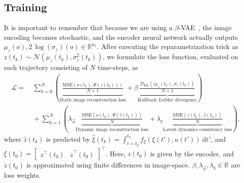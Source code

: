 \subsection{Training} 
It is important to remember that because we are using a $\beta$-\gls{VAE}~\citep{kingma2014auto, higgins2017beta}, the image encoding becomes stochastic, and the encoder neural network actually outputs $\mu_z(o), 2 \, \log(\sigma_z)(o) \in \mathbb{R}^{n_z}$. After executing the reparametrization trick as $z(t_k) \sim \mathcal{N}(\mu_z(t_k), \sigma_z^2(t_k))$, we formulate the loss function, evaluated on each trajectory consisting of $N$ time-steps, as
\begin{equation}\label{eq:training_loss}
\begin{split}
    \mathcal{L} =& \: \sum_{k=0}^{N} \left ( \underbrace{\frac{\mathrm{MSE}(o(t_k), \Psi(z(t_k)))}{N+1}}_{\text{Static image reconstruction loss}} + \beta \underbrace{\frac{\mathcal{D}_\mathrm{KL} \left ( (\mu_z(t_k), \sigma_z(t_k) \right )}{N+1}}_{\text{Kullback–Leibler divergence}} \right )\\
    &\: + \sum_{k=1}^{N} \left ( \lambda_{\vec{o}} \underbrace{ \frac{\mathrm{MSE}(o(t_k), \Psi(\hat{z}(t_k)))}{N}}_{\text{Dynamic image reconstruction loss}} + \lambda_{\mathrm{z}} \underbrace{\frac{\mathrm{MSE}(z(t_k), \hat{z}(t_k))}{N}}_{\text{Latent dynamics consistency loss}} \right ),
\end{split}
\end{equation}
where $\hat{z}(t_k)$ is predicted by $\hat{\xi}(t_k)  = \int_{t=t_0}^{t_k} f_\xi(\xi(t'), u(t')) \: \mathrm{d}t'$, and $\xi(t_0) = \begin{bmatrix}
    z^\top(t_0) & \dot{z}^\top(t_0)
\end{bmatrix}^\top$. Here, $z(t_0)$ is given by the encoder, and $\dot{z}(t_0)$ is approximated using finite differences in image-space. $\beta, \lambda_{\vec{o}}, \lambda_\mathrm{z} \in \mathbb{R}$ are loss weights.

